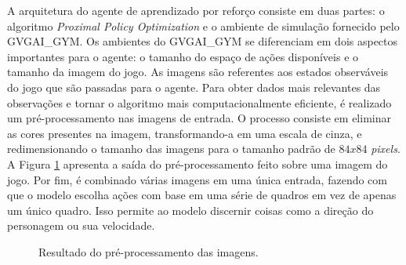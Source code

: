 A arquitetura do agente de aprendizado por reforço consiste em duas partes: o algoritmo \textit{Proximal Policy Optimization} e o ambiente de simulação fornecido pelo GVGAI\_GYM. Os ambientes do GVGAI\_GYM se diferenciam em dois aspectos importantes para o agente: o tamanho do espaço de ações disponíveis e o tamanho da imagem do jogo. As imagens são referentes aos estados observáveis do jogo que são passadas para o agente. Para obter dados mais relevantes das observações e tornar o algoritmo mais computacionalmente eficiente, é realizado um pré-processamento nas imagens de entrada. O processo consiste em eliminar as cores presentes na imagem, transformando-a em uma escala de cinza, e redimensionando o tamanho das imagens para o tamanho padrão de $84x84$ \textit{pixels}. A Figura \ref{fig:jogosanalisepp} apresenta a saída do pré-processamento feito sobre uma imagem do jogo. Por fim, é combinado várias imagens em uma única entrada, fazendo com que o modelo escolha ações com base em uma série de quadros em vez de apenas um único quadro. Isso permite ao modelo discernir coisas como a direção do personagem ou sua velocidade.

\begin{figure}[ht]
\centering
  \caption{Resultado do pré-processamento das imagens.}
  \label{fig:jogosanalisepp}
\end{figure}

